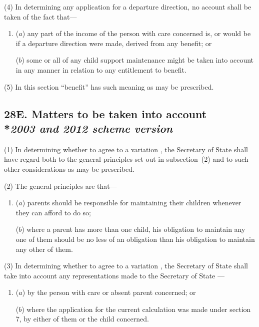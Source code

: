 \documentclass[12pt,a4paper]{article}
\begin{document}
(4) In determining any application for a departure direction, no account shall be taken of the fact that—
\begin{enumerate}\item[]
($a$) any part of the income of the person with care concerned is, or would be if a departure direction were made, derived from any benefit; or

($b$) some or all of any child support maintenance might be taken into account in any manner in relation to any entitlement to benefit.
\end{enumerate}

(5) In this section “benefit” has such meaning as may be prescribed.


\subsection[28E. Matters to be taken into account --- \emph{2003 and 2012 scheme version}]{28E. Matters to be taken into account\\*\emph{2003 and 2012 scheme version}}

(1) In determining 
whether to agree to a variation%
, the 
Secretary of State  %
shall have regard both to the general principles set out in subsection~(2) and to such other considerations as may be prescribed.

(2) The general principles are that—
\begin{enumerate}\item[]
($a$) parents should be responsible for maintaining their children whenever they can afford to do so;

($b$) where a parent has more than one child, his obligation to maintain any one of them should be no less of an obligation than his obligation to maintain any other of them.
\end{enumerate}

(3) In determining 
whether to agree to a variation%
, the 
Secretary of State  %
shall take into account any representations made to 
the Secretary of State%
—
\begin{enumerate}\item[]
($a$) by the person with care or absent parent concerned; or

($b$) where the application for the current 
calculation  %
was made under section 7, by either of them or the child concerned.
\end{enumerate}
\end{document}
